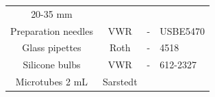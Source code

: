 \documentclass[11pt,singlespacinge,twoside]{reedthesis} %
\begin{document}
\begin{longtable}[]{@{}cccl@{}}
\begin{minipage}[t]{0.42\columnwidth}
20-35 mm\strut
\end{minipage} & \begin{minipage}[t]{0.11\columnwidth}\raggedright
\strut
\end{minipage}\tabularnewline
\begin{minipage}[t]{0.26\columnwidth}\centering
Preparation needles\strut
\end{minipage} & \begin{minipage}[t]{0.10\columnwidth}\centering
VWR\strut
\end{minipage} & \begin{minipage}[t]{0.42\columnwidth}\centering
-\strut
\end{minipage} & \begin{minipage}[t]{0.11\columnwidth}\raggedright
USBE5470\strut
\end{minipage}\tabularnewline
\begin{minipage}[t]{0.26\columnwidth}\centering
Glass pipettes\strut
\end{minipage} & \begin{minipage}[t]{0.10\columnwidth}\centering
Roth\strut
\end{minipage} & \begin{minipage}[t]{0.42\columnwidth}\centering
-\strut
\end{minipage} & \begin{minipage}[t]{0.11\columnwidth}\raggedright
4518\strut
\end{minipage}\tabularnewline
\begin{minipage}[t]{0.26\columnwidth}\centering
Silicone bulbs\strut
\end{minipage} & \begin{minipage}[t]{0.10\columnwidth}\centering
VWR\strut
\end{minipage} & \begin{minipage}[t]{0.42\columnwidth}\centering
-\strut
\end{minipage} & \begin{minipage}[t]{0.11\columnwidth}\raggedright
612-2327\strut
\end{minipage}\tabularnewline
\begin{minipage}[t]{0.26\columnwidth}\centering
Microtubes 2 mL\strut
\end{minipage} & \begin{minipage}[t]{0.10\columnwidth}\centering
Sarstedt\strut
\end{minipage} & \begin{minipage}[t]{0.42\columnwidth}\centering

\end{minipage}
\end{longtable}
\end{document}
